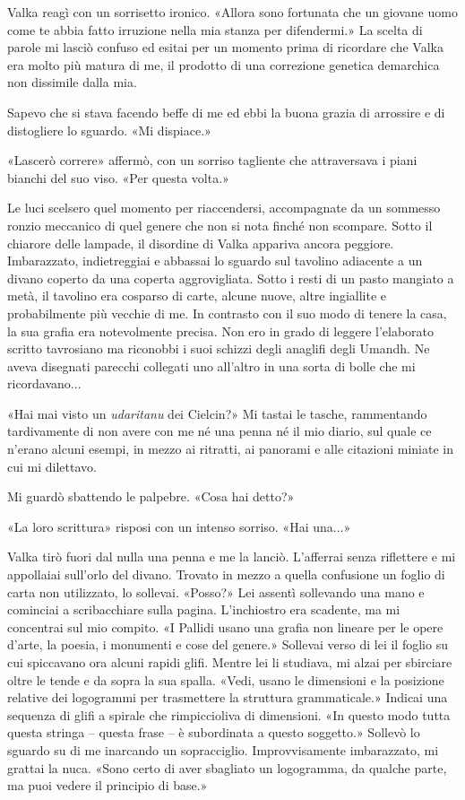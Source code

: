 Valka reagì con un sorrisetto ironico. «Allora sono fortunata che un
giovane uomo come te abbia fatto irruzione nella mia stanza per
difendermi.» La scelta di parole mi lasciò confuso ed esitai per un
momento prima di ricordare che Valka era molto più matura di me, il
prodotto di una correzione genetica demarchica non dissimile dalla mia.

Sapevo che si stava facendo beffe di me ed ebbi la buona grazia di
arrossire e di distogliere lo sguardo. «Mi dispiace.»

«Lascerò correre» affermò, con un sorriso tagliente che attraversava i
piani bianchi del suo viso. «Per questa volta.»

Le luci scelsero quel momento per riaccendersi, accompagnate da un
sommesso ronzio meccanico di quel genere che non si nota finché non
scompare. Sotto il chiarore delle lampade, il disordine di Valka
appariva ancora peggiore. Imbarazzato, indietreggiai e abbassai lo
sguardo sul tavolino adiacente a un divano coperto da una coperta
aggrovigliata. Sotto i resti di un pasto mangiato a metà, il tavolino
era cosparso di carte, alcune nuove, altre ingiallite e probabilmente
più vecchie di me. In contrasto con il suo modo di tenere la casa, la
sua grafia era notevolmente precisa. Non ero in grado di leggere
l'elaborato scritto tavrosiano ma riconobbi i suoi schizzi degli
anaglifi degli Umandh. Ne aveva disegnati parecchi collegati uno
all'altro in una sorta di bolle che mi ricordavano...

«Hai mai visto un \emph{udaritanu} dei Cielcin?» Mi tastai le tasche,
rammentando tardivamente di non avere con me né una penna né il mio
diario, sul quale ce n'erano alcuni esempi, in mezzo ai ritratti, ai
panorami e alle citazioni miniate in cui mi dilettavo.

Mi guardò sbattendo le palpebre. «Cosa hai detto?»

«La loro scrittura» risposi con un intenso sorriso. «Hai una...»

Valka tirò fuori dal nulla una penna e me la lanciò. L'afferrai senza
riflettere e mi appollaiai sull'orlo del divano. Trovato in mezzo a
quella confusione un foglio di carta non utilizzato, lo sollevai.
«Posso?» Lei assentì sollevando una mano e cominciai a scribacchiare
sulla pagina. L'inchiostro era scadente, ma mi concentrai sul mio
compito. «I Pallidi usano una grafia non lineare per le opere d'arte, la
poesia, i monumenti e cose del genere.» Sollevai verso di lei il foglio
su cui spiccavano ora alcuni rapidi glifi. Mentre lei li studiava, mi
alzai per sbirciare oltre le tende e da sopra la sua spalla. «Vedi,
usano le dimensioni e la posizione relative dei logogrammi per
trasmettere la struttura grammaticale.» Indicai una sequenza di glifi a
spirale che rimpiccioliva di dimensioni. «In questo modo tutta questa
stringa -- questa frase -- è subordinata a questo soggetto.» Sollevò lo
sguardo su di me inarcando un sopracciglio. Improvvisamente imbarazzato,
mi grattai la nuca. «Sono certo di aver sbagliato un logogramma, da
qualche parte, ma puoi vedere il principio di base.»


